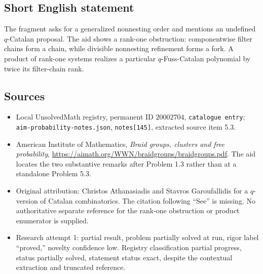 \documentclass[11pt]{article}
\begin{document}
\subsection{Short English statement}
The fragment asks for a generalized nonnesting order and mentions an undefined $q$-Catalan proposal. The aid shows a rank-one obstruction: componentwise filter chains form a chain, while divisible nonnesting refinement forms a fork. A product of rank-one systems realizes a particular $q$-Fuss-Catalan polynomial by twice its filter-chain rank.
\subsection{Sources}
\begin{itemize}
\item Local UnsolvedMath registry, permanent ID $20002704$, \texttt{catalogue entry}; \texttt{aim-probability-notes.json}, \texttt{notes[145]}, extracted source item 5.3.
\item American Institute of Mathematics, \emph{Braid groups, clusters and free probability}, \url{https://aimath.org/WWN/braidgroups/braidgroups.pdf}. The aid locates the two substantive remarks after Problem 1.3 rather than at a standalone Problem 5.3.
\item Original attribution: Christos Athanasiadis and Stavros Garoufallidis for a $q$-version of Catalan combinatorics. The citation following ``See'' is missing. No authoritative separate reference for the rank-one obstruction or product enumerator is supplied.
\item Research attempt 1: partial result, problem partially solved at run, rigor label ``proved,'' novelty confidence low. Registry classification partial progress, status partially solved, statement status exact, despite the contextual extraction and truncated reference.
\end{itemize}
\end{document}
